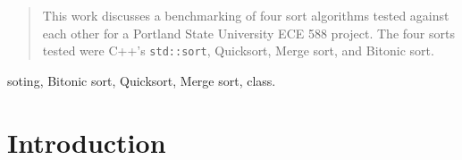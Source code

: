 \documentclass[journal]{IEEEtran}
\begin{document}







\maketitle


\begin{abstract}
This work discusses a benchmarking of four sort algorithms tested against each other for a Portland State University ECE 588 project. The four sorts tested were C++'s \texttt{std::sort}, Quicksort, Merge sort, and Bitonic sort.
\end{abstract}

\begin{IEEEkeywords}
soting, Bitonic sort, Quicksort, Merge sort, class.
\end{IEEEkeywords}






%
\IEEEpeerreviewmaketitle



\section{Introduction}
% 
% 
% 
% 
\end{document}
